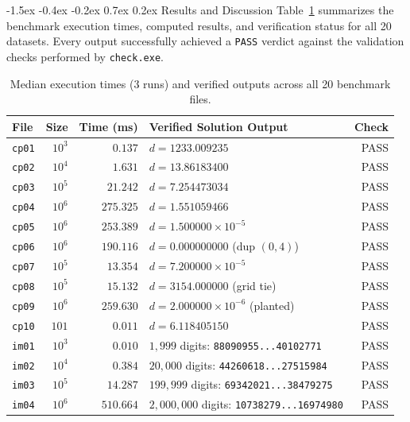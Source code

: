 \documentclass[10pt,twocolumn]{article}
\makeatletter
\renewcommand\section{\@startsection{section}{1}{\z@}%
  {-1.5ex \@plus -0.4ex \@minus -0.2ex}%
  {0.7ex \@plus 0.2ex}%
  {\normalfont\normalsize\bfseries}}
\makeatother
\begin{document}
\section{Results and Discussion}
Table~\ref{tab:results} summarizes the benchmark execution times, computed results, and verification status for all 20 datasets. Every output successfully achieved a \texttt{PASS} verdict against the validation checks performed by \texttt{check.exe}.

\begin{table}[t]
\centering
\caption{Median execution times ($3$ runs) and verified outputs across all 20 benchmark files.}
\label{tab:results}
\scriptsize
\setlength{\tabcolsep}{2.8pt}
\begin{tabularx}{\columnwidth}{@{}lrrXr@{}}
\toprule
\textbf{File} & \textbf{Size} & \textbf{Time (ms)} & \textbf{Verified Solution Output} & \textbf{Check} \\
\midrule
\texttt{cp01} & $10^3$ & $0.137$ & $d = 1233.009235$ & PASS \\
\texttt{cp02} & $10^4$ & $1.631$ & $d = 13.86183400$ & PASS \\
\texttt{cp03} & $10^5$ & $21.242$ & $d = 7.254473034$ & PASS \\
\texttt{cp04} & $10^6$ & $275.325$ & $d = 1.551059466$ & PASS \\
\texttt{cp05} & $10^6$ & $253.389$ & $d = 1.500000 \times 10^{-5}$ & PASS \\
\texttt{cp06} & $10^6$ & $190.116$ & $d = 0.000000000$ (dup $(0,4)$) & PASS \\
\texttt{cp07} & $10^5$ & $13.354$ & $d = 7.200000 \times 10^{-5}$ & PASS \\
\texttt{cp08} & $10^5$ & $15.132$ & $d = 3154.000000$ (grid tie) & PASS \\
\texttt{cp09} & $10^6$ & $259.630$ & $d = 2.000000 \times 10^{-6}$ (planted) & PASS \\
\texttt{cp10} & $101$ & $0.011$ & $d = 6.118405150$ & PASS \\
\midrule
\texttt{im01} & $10^3$ & $0.010$ & $1{,}999$ digits: \texttt{88090955...40102771} & PASS \\
\texttt{im02} & $10^4$ & $0.384$ & $20{,}000$ digits: \texttt{44260618...27515984} & PASS \\
\texttt{im03} & $10^5$ & $14.287$ & $199{,}999$ digits: \texttt{69342021...38479275} & PASS \\
\texttt{im04} & $10^6$ & $510.664$ & $2{,}000{,}000$ digits: \texttt{10738279...16974980} & PASS \\

\end{tabularx}
\end{table}
\end{document}
